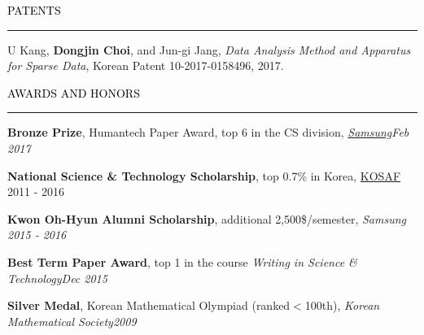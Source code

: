 \documentclass{resume} %
\renewenvironment{rSection}[1]{
	\sectionskip
	\textcolor{Black}{\MakeUppercase{#1}}
	\sectionlineskip
	\hrule
	\begin{list}{}{
			\setlength{\leftmargin}{1.5em}
		}
		\item[]
	}{
	\end{list}
}
\begin{document}

\begin{rSection}{Patents}
	\begin{rSubsection}{}{}{}{}
		\vspace*{-2.5mm}
		\item U Kang, \textbf{Dongjin Choi}, and Jun-gi Jang, \textit{Data Analysis Method and Apparatus for Sparse Data}, Korean Patent 10-2017-0158496, 2017.
	\end{rSubsection}
	
\end{rSection}
\vspace{-3mm}


\begin{rSection}{Awards and Honors}
	\vspace*{-2.5mm}
	\begin{rSubsection}{}{}{}{}
		\item \textbf{Bronze Prize}, Humantech Paper Award, top 6 in the CS division, \em{\href{https://humantech.samsung.com/saitext/index.jsp}{Samsung}}\em \hfill Feb 2017
		
		\item \textbf{National Science \& Technology Scholarship}, top 0.7\% in Korea, \href{http://www.kosaf.go.kr/}{KOSAF} \hfill 2011 - 2016
		
		\item \textbf{Kwon Oh-Hyun Alumni Scholarship}, additional 2,500\$/semester, \em Samsung \em \hfill 2015 - 2016
		
		\item \textbf{Best Term Paper Award}, top 1 in the course \em Writing in Science \& Technology\em \hfill Dec 2015

		\item \textbf{Silver Medal}, Korean Mathematical Olympiad (ranked$<$100th), \em Korean Mathematical Society\em \hfill 2009
		
	\end{rSubsection}

\end{rSection}
\vspace{-3mm}
\end{document}
